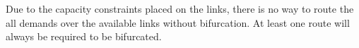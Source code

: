 Due to the capacity constraints placed on the links, there is no way to route
the all demands over the available links without bifurcation. At least one route
will always be required to be bifurcated.
